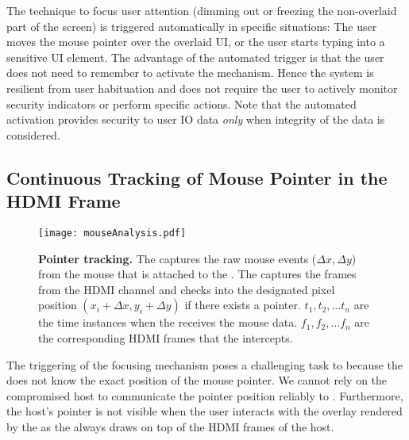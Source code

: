 
 The technique to focus user attention (dimming out or freezing the non-overlaid part of the screen) is triggered automatically in specific situations: The user moves the mouse pointer over the overlaid UI, or the user starts typing into a sensitive UI element. 
The advantage of the automated trigger is that the user does not need to remember to activate the mechanism. Hence the system is resilient from user habituation and does not require the user to actively monitor security indicators or perform specific actions. Note that the automated activation provides security to user IO data \emph{only} when integrity of the data is considered.

\subsection{Continuous Tracking of Mouse Pointer in the HDMI Frame}
\label{sec:systemDesign:analysis}


\begin{figure}[t]
\centering
\texttt{[image: mouseAnalysis.pdf]}
\caption{\textbf{Pointer tracking.} \one The \device captures the raw mouse events ($\Delta x, \Delta y$) from the mouse that is attached to the \device. \two The \device captures the frames from the HDMI channel and checks into the designated pixel position $(x_i + \Delta x, y_i + \Delta y)$ if there exists a pointer. $t_1, t_2,\ldots t_n$ are the time instances when the \device receives the mouse data. $f_1, f_2,\ldots f_n$ are the corresponding HDMI frames that the \device intercepts.}
\spacesave
\label{fig:mouseAnalysis}
\centering
\end{figure}


The triggering of the focusing mechanism poses a challenging task to \name because the \device does not know the exact position of the mouse pointer. We cannot rely on the compromised host to communicate the pointer position reliably to \device. Furthermore, the host's pointer is not visible when the user interacts with the overlay rendered by the \device as the \device always draws on top of the HDMI frames of the host. 

